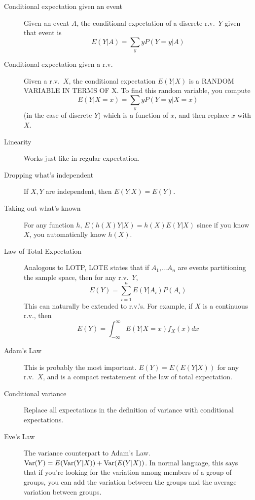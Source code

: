 \documentclass{article}
\begin{document}
 

\header

\begin{description}

\item[Conditional expectation given an event] Given an event $A$, the conditional expectation of a discrete r.v.~$Y$ given that event is $$E(Y|A) = \sum_y yP(Y=y|A)$$

\item[Conditional expectation given a r.v.] Given a r.v.~$X$, the conditional expectation $E(Y|X)$ is a RANDOM VARIABLE IN TERMS OF X. To find this random variable, you compute $$E(Y|X = x) = \sum_y yP(Y=y|X=x)$$ (in the case of discrete $Y$) which is a function of $x$, and then replace $x$ with $X$.

\item[Linearity] Works just like in regular expectation.

\item[Dropping what's independent] If $X, Y$ are independent, then $E(Y|X) = E(Y)$.

\item[Taking out what's known] For any function $h$, $E(h(X)Y|X) = h(X)E(Y|X)$ since if you know $X$, you automatically know $h(X)$.

\item[Law of Total Expectation] Analogous to LOTP, LOTE states that if $A_1$,...$A_n$ are events partitioning the sample space, then for any r.v.~$Y$,
\[
E(Y) = \sum_{i=1}^n E(Y|A_i)P(A_i)
\]
This can naturally be extended to r.v.'s. For example, if $X$ is a continuous r.v., then 
\[
E(Y) = \int_{-\infty}^{\infty} E(Y|X=x)f_X(x) dx
\]

\item[Adam's Law] This is probably the most important. $E(Y) = E(E(Y|X))$ for any r.v.~$X$, and is a compact restatement of the law of total expectation.

\item[Conditional variance] Replace all expectations in the definition of variance with conditional expectations.

\item[Eve's Law] The variance counterpart to Adam's Law. $\textrm{Var}(Y) = E(\textrm{Var}(Y|X)) + \textrm{Var}(E(Y|X))$. In normal language, this says that if you're looking for the variation among members of a group of groups, you can add the variation between the groups and the average variation between groups.


\end{description}
\end{document}
